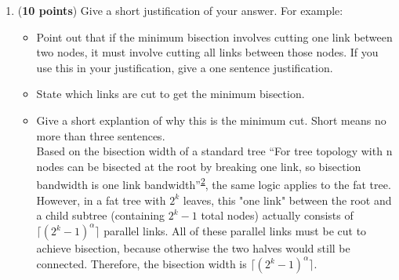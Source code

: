 \documentclass{article}
\newenvironment{answer}
{\color{blue}}
{\normalfont}
\begin{document}
\begin{enumerate}
\begin{enumerate}
\begin{enumerate}
	  \item (\textbf{10 points})
	    Give a short justification of your answer.  For example:
	    \begin{itemize}
	      \item Point out that if the minimum bisection involves cutting one
		link between two nodes, it must involve cutting all links between
		those nodes.  If you use this in your justification, give a one
		sentence justification.
	      \item State which links are cut to get the minimum bisection.
	      \item Give a short explantion of why this is the minimum cut.
		Short means no more than three sentences. \\
        \begin{answer}
          Based on the bisection width of a standard tree ``For tree topology with n nodes can be bisected at the root by breaking one link, so bisection bandwidth is one link bandwidth''\textsuperscript{{\hyperlink{ref2}{2}}}, the same logic applies to the fat tree.
          However, in a fat tree with $2^k$ leaves, this "one link" between the root and a child subtree (containing $2^k - 1$ total nodes) actually consists of $\lceil (2^k - 1)^{\alpha} \rceil$ parallel links.
          All of these parallel links must be cut to achieve bisection, because otherwise the two halves would still be connected.
          Therefore, the bisection width is $\lceil (2^k - 1)^{\alpha} \rceil$.
        \end{answer}
	    \end{itemize}
	\end{enumerate}


\end{enumerate}
\end{enumerate}
\end{document}
